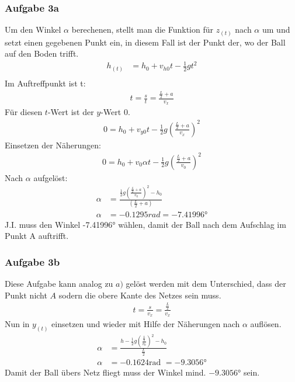 \documentclass[a4paper,11pt]{article}
\begin{document}
    \subsubsection*{Aufgabe 3a}
        Um den Winkel $\alpha$ berechenen, stellt man die Funktion für $z_{(t)}$ nach $\alpha$ um und setzt einen gegebenen Punkt ein, in diesem Fall ist der Punkt der, wo der Ball auf den Boden trifft.
        \begin{align*}
          h_{(t)}&=h_0+v_{h0}t-\frac{1}{2}gt^2 \\
        \end{align*}
        Im Auftreffpunkt ist t:
        \begin{align*}
          t=\frac{s}{t}=\frac{\frac{L}{2}+a}{v_x}
        \end{align*}
        Für diesen $t$-Wert ist der $y$-Wert 0.
        \begin{align*}
          0=h_0+v_{y0}t-\frac{1}{2}g\left(\frac{\frac{L}{2}+a}{v_x}\right)^2
        \end{align*}
        Einsetzen der Näherungen:
        \begin{align*}
          0=h_0+v_0\alpha t-\frac{1}{2}g\left(\frac{\frac{L}{2}+a}{v_0}\right)^2
        \end{align*}
        Nach $\alpha$ aufgelöst:
         \begin{align*}
          \alpha &= \frac{\frac{1}{2}g\left(\frac{\frac{L}{2}+a}{v_0}\right)^2-h_0}{\left(\frac{L}{2}+a\right)} \\
          \alpha &= -0.1295 rad = \ang{-7.41996}
        \end{align*}
        J.I. muss den Winkel \ang{-7.41996} wählen, damit der Ball nach dem Aufschlag im Punkt A auftrifft.
      \subsubsection*{Aufgabe 3b}
        Diese Aufgabe kann analog zu $a)$ gelöst werden mit dem Unterschied, dass der Punkt nicht $A$ sodern die obere Kante des Netzes sein muss.
        \begin{align*}
          t=\frac{s}{v_x}=\frac{\frac{L}{2}}{v_x}
        \end{align*}
        Nun in $y_{(t)}$ einsetzen und wieder mit Hilfe der Näherungen nach $\alpha$ auflösen.
        \begin{align*}
          \alpha &= \frac{h-\frac{1}{2}g\left(\frac{\frac{L}{2}}{v_0}\right)^2-h_0}{\frac{L}{2}} \\
          \alpha &= -0.1624 \mbox{rad } = \ang{-9.3056}
        \end{align*}
        Damit der Ball übers Netz fliegt muss der Winkel mind. $\ang{-9.3056}$ sein.
\end{document}
